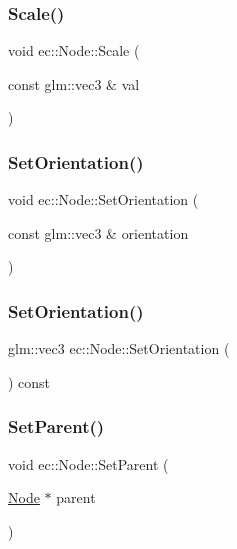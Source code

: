 \subsubsection{\texorpdfstring{Scale()}{Scale()}}
{\footnotesize\ttfamily void ec\+::\+Node\+::\+Scale (\begin{DoxyParamCaption}\item[{const glm\+::vec3 \&}]{val }\end{DoxyParamCaption})}

\mbox{\label{classec_1_1_node_a4b00f16b05542f0abfcc7eafbad50319}} 
\subsubsection{\texorpdfstring{Set\+Orientation()}{SetOrientation()}\hspace{0.1cm}{\footnotesize\ttfamily [1/2]}}
{\footnotesize\ttfamily void ec\+::\+Node\+::\+Set\+Orientation (\begin{DoxyParamCaption}\item[{const glm\+::vec3 \&}]{orientation }\end{DoxyParamCaption})}

\mbox{\label{classec_1_1_node_a841071e180e27ad6ced9878aa284c933}} 
\subsubsection{\texorpdfstring{Set\+Orientation()}{SetOrientation()}\hspace{0.1cm}{\footnotesize\ttfamily [2/2]}}
{\footnotesize\ttfamily glm\+::vec3 ec\+::\+Node\+::\+Set\+Orientation (\begin{DoxyParamCaption}{ }\end{DoxyParamCaption}) const}

\mbox{\label{classec_1_1_node_abda1732f28b0f81df2028d889eb73bdf}} 
\subsubsection{\texorpdfstring{Set\+Parent()}{SetParent()}}
{\footnotesize\ttfamily void ec\+::\+Node\+::\+Set\+Parent (\begin{DoxyParamCaption}\item[{\mbox{\hyperlink{classec_1_1_node}{Node}} $\ast$}]{parent }\end{DoxyParamCaption})}

